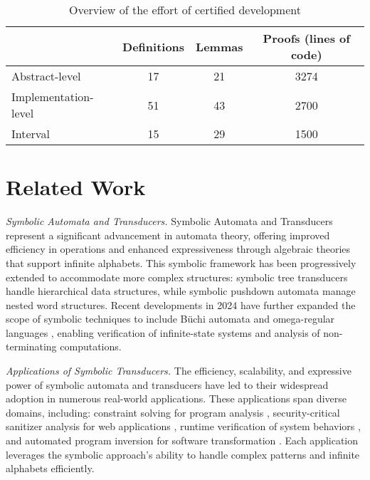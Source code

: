 \documentclass[a4paper,UKenglish,cleveref, autoref, thm-restate]{lipics-v2021}
\begin{document}
\begin{table}[h]
  \centering
  \begin{tabular}{lccc}
      \toprule
      & \textbf{Definitions} & \textbf{Lemmas} & \textbf{Proofs} (lines of code) \\
      \midrule
      Abstract-level & 17 & 21 & 3274 \\
      Implementation-level & 51 & 43 & 2700 \\
      Interval & 15 & 29 & 1500 \\
      \bottomrule
  \end{tabular}
  \caption{Overview of the effort of certified development}
  \label{tab:abstract_impl}
\end{table}


\section{Related Work}
\label{sec:related-work}

\emph{Symbolic Automata and Transducers.} Symbolic Automata and Transducers \cite{cav/DAntoniV17,VeanesHLMB12Transducer, popl/DAntoniV14, entcs/DAntoniKW18, sofsem/TammV18} represent a significant advancement in automata theory, offering improved efficiency in operations and enhanced expressiveness through algebraic theories that support infinite alphabets. This symbolic framework has been progressively extended to accommodate more complex structures: symbolic tree transducers \cite{ershov/VeanesB11} handle hierarchical data structures, while symbolic pushdown automata \cite{cav/DAntoniA14} manage nested word structures. Recent developments in 2024 have further expanded the scope of symbolic techniques to include B\"{u}chi automata and omega-regular languages \cite{pacmpl/VeanesBEZ25}, enabling verification of infinite-state systems and analysis of non-terminating computations.

\emph{Applications of Symbolic Transducers.} The efficiency, scalability, and expressive power of symbolic automata and transducers have led to their widespread adoption in numerous real-world applications. These applications span diverse domains, including: constraint solving for program analysis \cite{lpar/VeanesBM10}, security-critical sanitizer analysis for web applications \cite{uss/HooimeijerLMSV11}, runtime verification of system behaviors \cite{osdi/YaseenABCL20}, and automated program inversion for software transformation \cite{pldi/HuD17}. Each application leverages the symbolic approach's ability to handle complex patterns and infinite alphabets efficiently.
\end{document}
